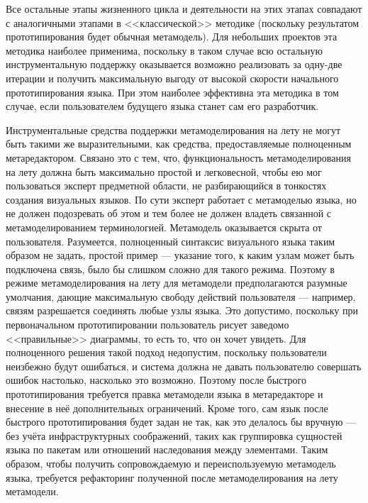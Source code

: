 Все остальные этапы жизненного цикла и деятельности на этих этапах совпадают с аналогичными 
этапами в <<классической>> методике (поскольку результатом прототипирования будет 
обычная метамодель). Для небольших проектов эта методика наиболее применима, поскольку 
в таком случае всю остальную инструментальную поддержку оказывается возможно реализовать 
за одну-две итерации и получить максимальную выгоду от высокой скорости начального 
прототипирования языка. При этом наиболее эффективна эта методика в том случае, 
если пользователем будущего языка станет сам его разработчик.

Инструментальные средства поддержки метамоделирования на лету не могут быть такими же 
выразительными, как средства, предоставляемые полноценным метаредактором. Связано 
это с тем, что, функциональность метамоделирования на лету должна быть максимально 
простой и легковесной, чтобы ею мог пользоваться эксперт предметной области, не разбирающийся 
в тонкостях создания визуальных языков. По сути эксперт работает с метамоделью языка, 
но не должен подозревать об этом и тем более не должен владеть связанной с метамоделированием 
терминологией. Метамодель оказывается скрыта от пользователя. Разумеется, полноценный 
синтаксис визуального языка таким образом не задать, простой пример --- указание того, 
к каким узлам может быть подключена связь, было бы слишком сложно для такого режима. 
Поэтому в режиме метамоделирования на лету для метамодели предполагаются разумные умолчания, 
дающие максимальную свободу действий пользователя --- например, связям разрешается соединять 
любые узлы языка. Это допустимо, поскольку при первоначальном прототипировании пользователь 
рисует заведомо <<правильные>> диаграммы, то есть то, что он хочет увидеть. Для полноценного 
решения такой подход недопустим, поскольку пользователи неизбежно будут ошибаться, и 
система должна не давать пользователю совершать ошибок настолько, насколько это возможно. 
Поэтому после быстрого прототипирования требуется правка метамодели языка в метаредакторе 
и внесение в неё дополнительных ограничений. Кроме того, сам язык после быстрого прототипирования 
будет задан не так, как это делалось бы вручную --- без учёта инфраструктурных соображений, 
таких как группировка сущностей языка по пакетам или отношений наследования между элементами. 
Таким образом, чтобы получить сопровождаемую и переиспользуемую метамодель языка, требуется 
рефакторинг полученной после метамоделирования на лету метамодели.

